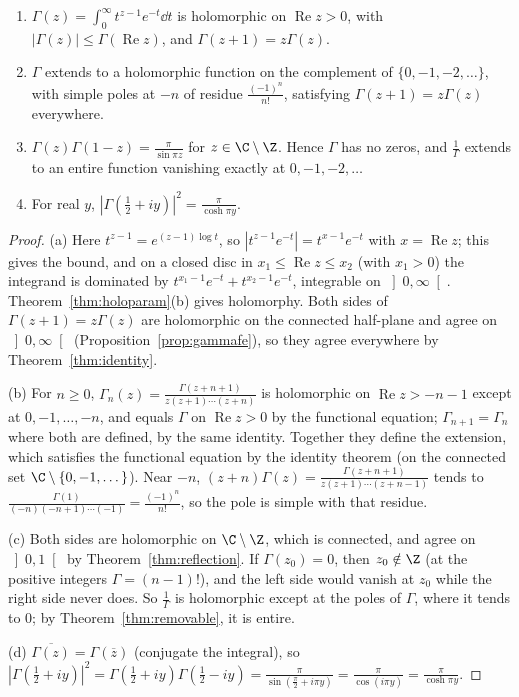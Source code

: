 \begin{theorem}\label{thm:gammac}
\begin{enumerate}[label=(\alph*)]
\item $\Gamma(z)=\int_0^\infty t^{z-1}e^{-t}\dd t$ is holomorphic on $\operatorname{Re}z>0$, with $|\Gamma(z)|\le\Gamma(\operatorname{Re}z)$, and $\Gamma(z+1)=z\Gamma(z)$.
\item $\Gamma$ extends to a holomorphic function on the complement of $\{0,-1,-2,\dots\}$, with simple poles at $-n$ of residue $\frac{(-1)^n}{n!}$, satisfying
$\Gamma(z+1)=z\Gamma(z)$ everywhere.
\item $\Gamma(z)\Gamma(1-z)=\frac\pi{\sin\pi z}$ for $z\in\C\setminus\Z$. Hence $\Gamma$ has no zeros, and $\frac1\Gamma$ extends to an entire function vanishing exactly at
$0,-1,-2,\dots$
\item For real $y$, $|\Gamma(\frac12+iy)|^2=\frac\pi{\cosh\pi y}$.
\end{enumerate}
\end{theorem}
\begin{proof}
(a) Here $t^{z-1}=e^{(z-1)\log t}$, so $|t^{z-1}e^{-t}|=t^{x-1}e^{-t}$ with $x=\operatorname{Re}z$; this gives the bound, and on a closed disc in $x_1\le\operatorname{Re}z\le x_2$ (with
$x_1>0$) the integrand is dominated by $t^{x_1-1}e^{-t}+t^{x_2-1}e^{-t}$, integrable on $\left]0,\infty\right[$. Theorem~\ref{thm:holoparam}(b) gives holomorphy. Both sides of
$\Gamma(z+1)=z\Gamma(z)$ are holomorphic on the connected half-plane and agree on $\left]0,\infty\right[$ (Proposition~\ref{prop:gammafe}), so they agree everywhere by
Theorem~\ref{thm:identity}.

(b) For $n\ge0$, $\Gamma_n(z)=\frac{\Gamma(z+n+1)}{z(z+1)\cdots(z+n)}$ is holomorphic on $\operatorname{Re}z>-n-1$ except at $0,-1,\dots,-n$, and equals $\Gamma$ on $\operatorname{Re}z>0$ by
the functional equation; $\Gamma_{n+1}=\Gamma_n$ where both are defined, by the same identity. Together they define the extension, which
satisfies the functional equation by the identity theorem (on the connected set $\C\setminus\{0,-1,\dots\}$). Near $-n$, $(z+n)\Gamma(z)=\frac{\Gamma(z+n+1)}{z(z+1)\cdots(z+n-1)}$
tends to $\frac{\Gamma(1)}{(-n)(-n+1)\cdots(-1)}=\frac{(-1)^n}{n!}$, so the pole is simple with that residue.

(c) Both sides are holomorphic on $\C\setminus\Z$, which is connected, and agree on $\left]0,1\right[$ by Theorem~\ref{thm:reflection}. If $\Gamma(z_0)=0$, then $z_0\notin\Z$
(at the positive integers $\Gamma=(n-1)!$), and the left side would vanish at $z_0$ while the right side never does. So $\frac1\Gamma$ is holomorphic
except at the poles of $\Gamma$, where it tends to $0$; by Theorem~\ref{thm:removable}, it is entire.

(d) $\overline{\Gamma(z)}=\Gamma(\overline z)$ (conjugate the integral), so $|\Gamma(\frac12+iy)|^2=\Gamma(\frac12+iy)\Gamma(\frac12-iy)=\frac\pi{\sin(\frac\pi2+i\pi y)}=\frac\pi{\cos(i\pi y)}=\frac\pi{\cosh\pi y}$.
\end{proof}

